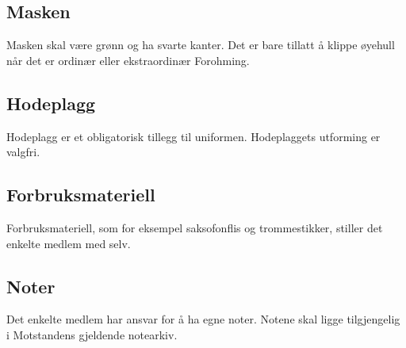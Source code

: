     \subsection{Masken}
        \begin{statute}
            Masken skal være grønn og ha svarte kanter. Det er bare tillatt å klippe øyehull når det er ordinær eller ekstraordinær Forohming.
        \end{statute}
        
    \subsection{Hodeplagg}
        \begin{statute}
            Hodeplagg er et obligatorisk tillegg til uniformen. Hodeplaggets utforming er valgfri.
        \end{statute}
        
    \subsection{Forbruksmateriell}
        \begin{statute}
            Forbruksmateriell, som for eksempel saksofonflis og trommestikker, stiller det enkelte medlem med selv.
        \end{statute}
        
    \subsection{Noter}
        \begin{statute}
            Det enkelte medlem har ansvar for å ha egne noter. Notene skal ligge tilgjengelig i Motstandens gjeldende notearkiv.
        \end{statute}
     